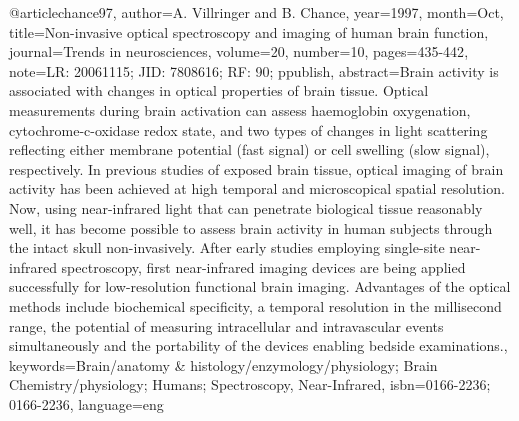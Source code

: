 @article{chance97,
	author={A. Villringer and B. Chance},
	year={1997},
	month={Oct},
	title={Non-invasive optical spectroscopy and imaging of human brain function},
	journal={Trends in neurosciences},
	volume={20},
	number={10},
	pages={435-442},
	note={LR: 20061115; JID: 7808616; RF: 90; ppublish},
	abstract={Brain activity is associated with changes in optical properties of brain tissue. Optical measurements during brain activation can assess haemoglobin oxygenation, cytochrome-c-oxidase redox state, and two types of changes in light scattering reflecting either membrane potential (fast signal) or cell swelling (slow signal), respectively. In previous studies of exposed brain tissue, optical imaging of brain activity has been achieved at high temporal and microscopical spatial resolution. Now, using near-infrared light that can penetrate biological tissue reasonably well, it has become possible to assess brain activity in human subjects through the intact skull non-invasively. After early studies employing single-site near-infrared spectroscopy, first near-infrared imaging devices are being applied successfully for low-resolution functional brain imaging. Advantages of the optical methods include biochemical specificity, a temporal resolution in the millisecond range, the potential of measuring intracellular and intravascular events simultaneously and the portability of the devices enabling bedside examinations.},
	keywords={Brain/anatomy & histology/enzymology/physiology; Brain Chemistry/physiology; Humans; Spectroscopy, Near-Infrared},
	isbn={0166-2236; 0166-2236},
	language={eng}
}

